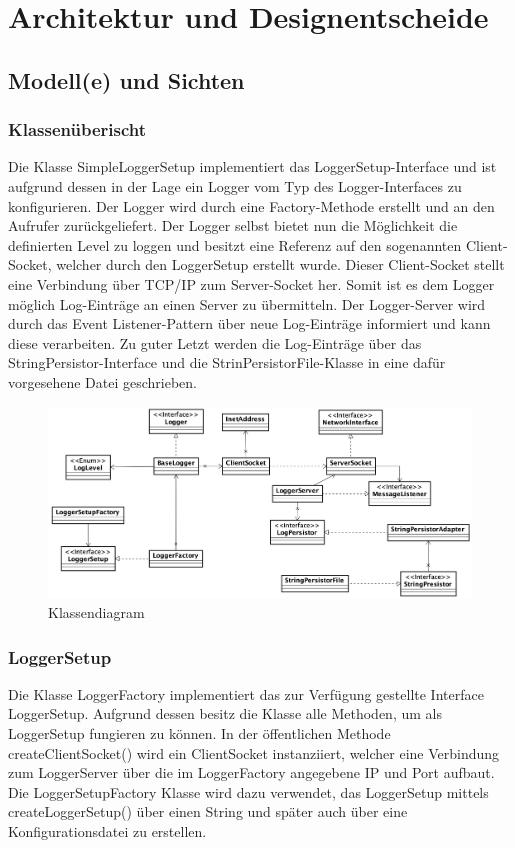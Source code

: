 \section{Architektur und Designentscheide}
\subsection{Modell(e) und Sichten}

\subsubsection{Klassenüberischt}
Die Klasse SimpleLoggerSetup implementiert das LoggerSetup-Interface und ist aufgrund dessen in der Lage ein Logger vom Typ des Logger-Interfaces zu konfigurieren. Der Logger wird durch eine Factory-Methode erstellt und an den Aufrufer zurückgeliefert. Der Logger selbst bietet nun die Möglichkeit die definierten Level zu loggen und besitzt eine Referenz auf den sogenannten Client-Socket, welcher durch den LoggerSetup erstellt wurde. Dieser Client-Socket stellt eine Verbindung über TCP/IP zum Server-Socket her. Somit ist es dem Logger möglich Log-Einträge an einen Server zu übermitteln. Der Logger-Server wird durch das Event Listener-Pattern über neue Log-Einträge informiert und kann diese verarbeiten. Zu guter Letzt werden die Log-Einträge über das StringPersistor-Interface und die StrinPersistorFile-Klasse in eine dafür vorgesehene Datei geschrieben.

\begin{figure}[H]
	\centering
	\includegraphics[width=\textwidth]{2_Architektur/Bilder/classOverview.png}
	\caption{Klassendiagram}
	\label{fig:classdiagram }
\end{figure}

\newpage
\subsubsection{LoggerSetup}
Die Klasse LoggerFactory implementiert das zur Verfügung gestellte Interface LoggerSetup. Aufgrund dessen besitz die Klasse alle Methoden, um als LoggerSetup fungieren zu können. In der öffentlichen Methode createClientSocket() wird ein ClientSocket instanziiert, welcher eine Verbindung zum LoggerServer über die im LoggerFactory angegebene IP und Port aufbaut. Die LoggerSetupFactory Klasse wird dazu verwendet, das LoggerSetup mittels createLoggerSetup() über einen String und später auch über eine Konfigurationsdatei zu erstellen. 

